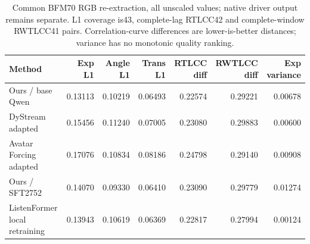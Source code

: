 \begin{table}[H]
\centering\small
\caption{Common BFM70 RGB re-extraction, all unscaled values; native driver output remains separate. L1 coverage is43, complete-lag RTLCC42 and complete-window RWTLCC41 pairs. Correlation-curve differences are lower-is-better distances; variance has no monotonic quality ranking.}
\label{tab:bfm-video}
\setlength{\tabcolsep}{4pt}
\begin{tabular}{lrrrrrr}
\toprule
Method & Exp L1 & Angle L1 & Trans L1 & RTLCC diff & RWTLCC diff & Exp variance \\
\midrule
Ours / base Qwen & 0.13113 & 0.10219 & 0.06493 & 0.22574 & 0.29221 & 0.00678 \\
DyStream adapted & 0.15456 & 0.11240 & 0.07005 & 0.23080 & 0.29883 & 0.00600 \\
Avatar Forcing adapted & 0.17076 & 0.10834 & 0.08186 & 0.24798 & 0.29140 & 0.00908 \\
Ours / SFT2752 & 0.14070 & 0.09330 & 0.06410 & 0.23090 & 0.29779 & 0.01274 \\
ListenFormer local retraining & 0.13943 & 0.10619 & 0.06369 & 0.22817 & 0.27994 & 0.00124 \\
\bottomrule
\end{tabular}
\end{table}
